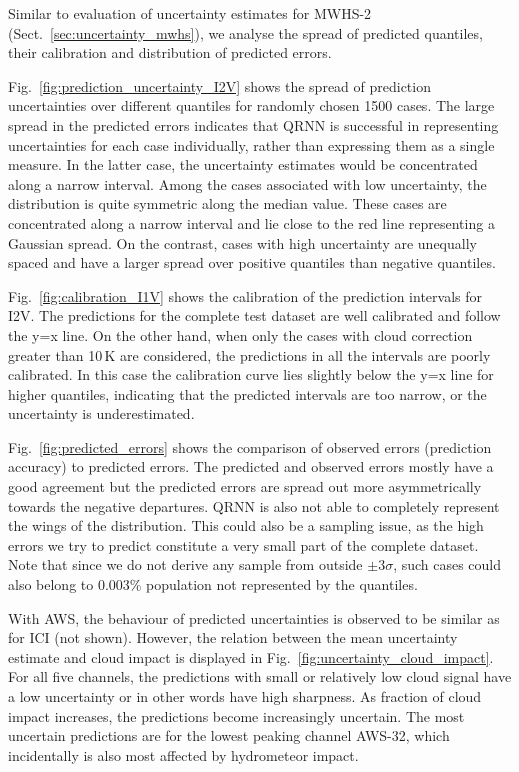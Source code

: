 \documentclass[amt, manuscript]{copernicus}
\begin{document}
Similar to evaluation of uncertainty estimates for MWHS-2 (Sect.~\ref{sec:uncertainty_mwhs}), we analyse the spread of predicted quantiles, their calibration and distribution of predicted errors. 

Fig.~\ref{fig:prediction_uncertainty_I2V} shows the spread of prediction uncertainties over different quantiles for randomly chosen 1500 cases. The large spread in the predicted errors indicates that QRNN is successful in representing uncertainties for each case individually, rather than expressing them as a single measure. In the latter case, the uncertainty estimates would be concentrated along a narrow interval. Among the cases associated with low uncertainty, the distribution is quite symmetric along the median value. These cases are concentrated along a narrow interval and lie close to the red line representing a Gaussian spread. On the contrast, cases with high uncertainty are unequally spaced and have a larger spread over positive quantiles than negative quantiles. 

Fig.~\ref{fig:calibration_I1V} shows the calibration of the prediction intervals for I2V. The predictions for the complete test dataset are well calibrated and follow the y=x line. On the other hand, when only the cases with  cloud correction greater than 10\,K are considered, the predictions in all the intervals are poorly calibrated. In this case the calibration curve lies slightly below the y=x line for higher quantiles, indicating that the predicted intervals are too narrow, or the uncertainty is underestimated. 

Fig.~\ref{fig:predicted_errors} shows the comparison of observed errors (prediction accuracy) to predicted errors. The predicted and observed errors mostly have a good agreement but the predicted errors are spread out more asymmetrically towards the negative departures. QRNN is also not able to completely represent the wings of the distribution. This could also be a sampling issue, as the high errors we try to predict constitute a very small part of the complete dataset. Note that since we do not derive any sample from outside $\pm3\sigma$, such cases could also belong to 0.003\% population not represented by the quantiles.   

With AWS, the behaviour of predicted uncertainties is observed to be similar as for ICI (not shown). However, the relation between the mean uncertainty estimate and cloud impact is displayed in Fig.~\ref{fig:uncertainty_cloud_impact}. For all five channels, the predictions with small or relatively low cloud signal have a low uncertainty or in other words have high sharpness. As fraction of cloud impact increases, the predictions become increasingly uncertain. The most uncertain predictions are for the lowest peaking channel AWS-32, which incidentally is also most affected by  hydrometeor impact.  
\end{document}
